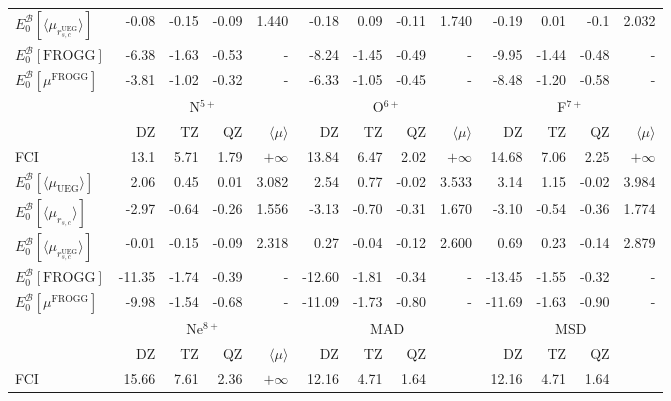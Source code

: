 \documentclass[aip,jcp,reprint,noshowkeys,superscriptaddress,twocolumn]{revtex4-1}
\newcommand{\frogg}[0]{\text{FROGG}}
\newcommand{\mfrogg}[0]{\mu^\text{FROGG}}
\newcommand{\basis}[0]{\mathcal{B}}
\newcommand{\muuegav}{\langle \mu_{\text{UEG}}\rangle}
\newcommand{\muav}{\langle \mu\rangle}
\newcommand{\murscav}{\langle \mu_{r_{s,c}}\rangle}
\newcommand{\mursclda}{\langle \mu_{r_{s,c}^{\text{UEG}}}\rangle}
\begin{document}
\begin{table}
\begin{ruledtabular}
\begin{tabular}{l|rrr|r||rrr|r||rrr|r|}
$E_0^{\basis}[\mursclda]$&  -0.08  &  -0.15   & -0.09   &1.440     &  -0.18  &   0.09   &  -0.11  &1.740     &  -0.19  &   0.01   &  -0.1  &2.032        \\  
$E_0^{\basis}[\frogg]$   &  -6.38  &  -1.63   & -0.53   &   -      &  -8.24  &  -1.45   &  -0.49  &    -     &  -9.95  &  -1.44   &  -0.48 &     -       \\
$E_0^{\basis}[\mfrogg]$  &  -3.81  &  -1.02   & -0.32   &   -      &  -6.33  &  -1.05   &  -0.45  &    -     &  -8.48  &  -1.20   &  -0.58 &     -       \\
\hline              
                         &\multicolumn{4}{c}{N$^{5+}$}   & \multicolumn{4}{c}{O$^{6+}$}            & \multicolumn{4}{c}{F$^{7+}$}    \\
                         &   DZ    &  TZ      &   QZ     & $\muav$ &  DZ     &   TZ    &  QZ     & $\muav$&   DZ    &   TZ     &  QZ    & $\muav$  \\
\hline              
 FCI                     &  13.1   &   5.71   &  1.79    &$+\infty$  &  13.84  &   6.47  &  2.02   &$+\infty$ &  14.68  &   7.06   &  2.25   &$+\infty$   \\  
$E_0^{\basis}[\muuegav]$ &  2.06   &   0.45   &  0.01    &3.082      &  2.54   &   0.77  & -0.02   &3.533     &  3.14   &   1.15   & -0.02   &3.984       \\  
$E_0^{\basis}[\murscav]$ &  -2.97  &  -0.64   &  -0.26   &1.556      & -3.13   &  -0.70  & -0.31   &1.670     & -3.10   &  -0.54   & -0.36   &1.774       \\  
$E_0^{\basis}[\mursclda]$&  -0.01  &  -0.15   &  -0.09   &2.318      &  0.27   &  -0.04  & -0.12   &2.600     &  0.69   &   0.23   & -0.14   &2.879       \\  
$E_0^{\basis}[\frogg]$   &  -11.35 &  -1.74   &  -0.39   &    -      & -12.60  &  -1.81  & -0.34   &   -      & -13.45  &  -1.55   & -0.32   &    - \\
$E_0^{\basis}[\mfrogg]$  &   -9.98 &  -1.54   &  -0.68   &    -      & -11.09  &  -1.73  & -0.80   &   -      & -11.69  &  -1.63   & -0.90   &    - \\
\hline              
                         &\multicolumn{4}{c}{Ne$^{8+}$}  & \multicolumn{4}{c}{MAD} & \multicolumn{4}{c}{MSD}    \\
                         &   DZ    &  TZ      &   QZ     & $\muav$ &  DZ     &   TZ     &  QZ     &          &   DZ    &   TZ     &  QZ    &         \\
\hline              
 FCI                     &  15.66  &   7.61   &  2.36    &$+\infty$  & 12.16   &    4.71  &    1.64 &          &  12.16   &   4.71   &    1.64&      \\   

\end{tabular}
\end{ruledtabular}
\end{table}
\end{document}
